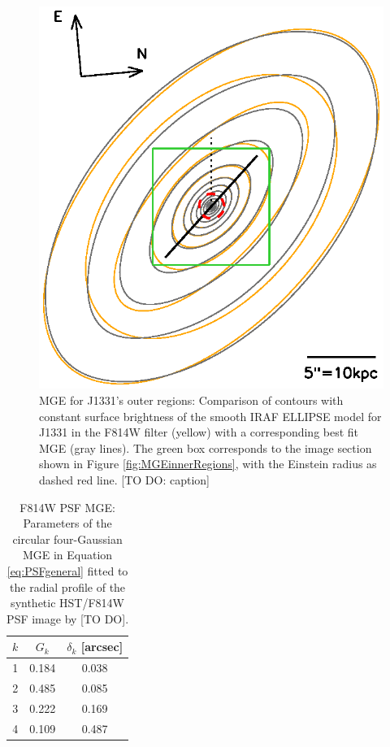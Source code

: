 \begin{figure}
\centering
\includegraphics[width=0.8\columnwidth]{fig/1331F814W_MGE_disk_L.ps}
\caption{MGE for J1331's outer regions: Comparison of contours with constant surface brightness of the smooth IRAF ELLIPSE model for J1331 in the F814W filter (yellow) with a corresponding best fit MGE (gray lines). The green box corresponds to the image section shown in Figure \ref{fig:MGEinnerRegions}, with the Einstein radius as dashed red line. [TO DO: caption]}
\label{fig:MGEouterRegions}
\end{figure}


\begin{table}
\centering
\caption{F814W PSF MGE: Parameters of the circular four-Gaussian MGE in Equation \ref{eq:PSFgeneral} fitted to the radial profile of the synthetic HST/F814W PSF image by [TO DO].}
\begin{tabular}{ccc}
\hline
$k$ & $G_k$ & $\delta_k$ [arcsec] \\\hline
1 & 0.184 & 0.038\\
2 & 0.485 & 0.085\\
3 & 0.222 & 0.169\\
4 & 0.109 & 0.487\\\hline
\end{tabular}
\label{tab:PSFMGEF814W}
\end{table}

